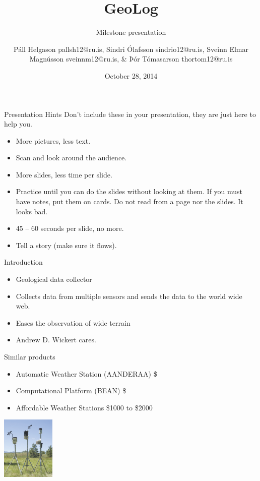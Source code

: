 \documentclass{beamer}
\title{GeoLog}
\subtitle{Milestone presentation}
\author[P. Helgasson, S. Ólafsson, S. Magnússon, \& Þ. Tómasarson]{Páll Helgason pallsh12@ru.is, Sindri Ólafsson sindrio12@ru.is, Sveinn Elmar Magnússon sveinnm12@ru.is, \& Þór Tómasarson thortom12@ru.is}
\institute[RU]{
  Department of Science and Engineering (TVD) \\
  Reykjavík University \\
}
\date{October 28, 2014} %
\begin{document}
\begin{frame}[plain]
  \titlepage
\end{frame}

\begin{frame}{Presentation Hints}
Don't include these in your presentation, they are just here to help you.
\begin{itemize}
\item More pictures, less text.
\item Scan and look around the audience.
\item More slides, less time per slide.
\item Practice until you can do the slides without looking at them.
  If you must have notes, put them on cards.  Do not read from a page
  nor the slides.  It looks bad.
\item 45 -- 60 seconds per slide, no more.
\item Tell a story (make sure it flows).
\end{itemize}
\end{frame}

\begin{frame}{Introduction}
\begin{itemize}
\item Geological data collector
\item Collects data from multiple sensors and sends the data to the world wide web. 
\item Eases the observation of wide terrain
\item Andrew D. Wickert cares.
\end{itemize}
\end{frame}

\begin{frame}{Similar products}
\begin{itemize}
\item Automatic Weather Station (AANDERAA) \$ \cite{AANDERAA}
\item Computational Platform (BEAN) \$ \cite{BEAN}
\item Affordable Weather Stations \$1000 to \$2000 \cite{AffordableWS}
\end{itemize}
\centering
\includegraphics[height=3cm]{graphics/affordableWS.png}
\cite{AffordableWS}
\end{frame}
\end{document}
